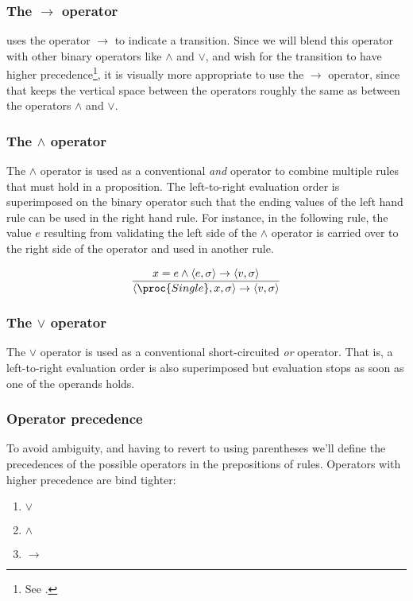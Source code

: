 \subsubsection{The $\rightarrow$ operator}

\cite{sos} uses the operator $\longrightarrow$ to indicate a transition. Since
we will blend this operator with other binary operators like $\wedge$ and
$\vee$, and wish for the transition to have higher precedence\footnote{See
.}, it is visually more appropriate to use the
$\rightarrow$ operator, since that keeps the vertical space between the
operators roughly the same as between the operators $\wedge$ and $\vee$.

\subsubsection{The $\wedge$ operator}

The $\wedge$ operator is used as a conventional \emph{and} operator to combine
multiple rules that must hold in a proposition. The left-to-right evaluation
order is superimposed on the binary operator such that the ending values of the
left hand rule can be used in the right hand rule. For instance, in the
following rule, the value $e$ resulting from validating the left side of the
$\wedge$ operator is carried over to the right side of the operator and used in
another rule.

\begin{equation}\label{appendix:equation:single}
{\displaystyle
  x = e
\wedge
  \left\langle e,\sigma\right\rangle
  \rightarrow
  \left\langle v,\sigma\right\rangle
\over\displaystyle
  \left\langle \proc{Single}, x,\sigma\right\rangle
  \rightarrow
  \left\langle v,\sigma\right\rangle
}
\end{equation}

\subsubsection{The $\vee$ operator}

The $\vee$ operator is used as a conventional short-circuited \emph{or}
operator. That is, a left-to-right evaluation order is also superimposed but
evaluation stops as soon as one of the operands holds.

\subsubsection{Operator precedence}\label{appendix:sos:precedence}

To avoid ambiguity, and having to revert to using parentheses we'll define the
precedences of the possible operators in the prepositions of rules. Operators
with higher precedence are bind tighter:

\begin{enumerate}

\item $\vee$

\item $\wedge$

\item $\rightarrow$

\end{enumerate}

